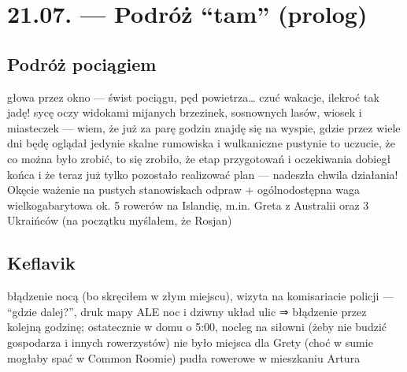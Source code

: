 \chapter*{21.07. --- Podróż “tam” (prolog)}


\section*{Podróż pociągiem}

głowa przez okno --- świst pociągu, pęd powietrza… czuć wakacje, ilekroć tak jadę!
sycę oczy widokami mijanych brzezinek, sosnownych lasów, wiosek i miasteczek --- wiem, że już za parę godzin znajdę się na wyspie, gdzie przez wiele dni będę oglądał jedynie skalne rumowiska i wulkaniczne pustynie
to uczucie, że co można było zrobić, to się zrobiło, że etap przygotowań i oczekiwania dobiegł końca i że teraz już tylko pozostało realizować plan --- nadeszła chwila działania!
Okęcie
ważenie na pustych stanowiskach odpraw + ogólnodostępna waga wielkogabarytowa
ok. 5 rowerów na Islandię, m.in. Greta z Australii oraz 3 Ukraińców (na początku myślałem, że Rosjan)

\section*{Keflavik}

błądzenie nocą (bo skręciłem w złym miejscu), wizyta na komisariacie policji --- “gdzie dalej?”, druk mapy ALE noc i dziwny układ ulic ⇒ błądzenie przez kolejną godzinę; ostatecznie w domu o 5:00, nocleg na siłowni (żeby nie budzić gospodarza i innych rowerzystów)
nie było miejsca dla Grety (choć w sumie mogłaby spać w Common Roomie)
pudła rowerowe w mieszkaniu Artura
